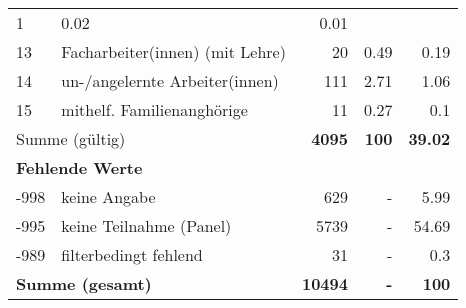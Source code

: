 \begin{longtable}{lXrrr}
       \num{1} &
       \num[round-mode=places,round-precision=2]{0,02} &
         \num[round-mode=places,round-precision=2]{0,01} \\

     13 &
     \multicolumn{1}{X}{ Facharbeiter(innen) (mit Lehre)   } &


       \num{20} &
       \num[round-mode=places,round-precision=2]{0,49} &
         \num[round-mode=places,round-precision=2]{0,19} \\

     14 &
     \multicolumn{1}{X}{ un-/angelernte Arbeiter(innen)   } &


       \num{111} &
       \num[round-mode=places,round-precision=2]{2,71} &
         \num[round-mode=places,round-precision=2]{1,06} \\

     15 &
     \multicolumn{1}{X}{ mithelf. Familienanghörige   } &


       \num{11} &
       \num[round-mode=places,round-precision=2]{0,27} &
         \num[round-mode=places,round-precision=2]{0,1} \\
     \midrule
     \multicolumn{2}{l}{Summe (gültig)} &
       \textbf{\num{4095}} &
     \textbf{100} &
       \textbf{\num[round-mode=places,round-precision=2]{39,02}} \\
     \multicolumn{5}{l}{\textbf{Fehlende Werte}}\\
       -998 &
       keine Angabe &
         \num{629} &
        - &
         \num[round-mode=places,round-precision=2]{5,99} \\
       -995 &
       keine Teilnahme (Panel) &
         \num{5739} &
        - &
         \num[round-mode=places,round-precision=2]{54,69} \\
       -989 &
       filterbedingt fehlend &
         \num{31} &
        - &
         \num[round-mode=places,round-precision=2]{0,3} \\
     \midrule
     \multicolumn{2}{l}{\textbf{Summe (gesamt)}} &
          \textbf{\num{10494}} &
        \textbf{-} &
        \textbf{100} \\
     \bottomrule
     \end{longtable}
     
